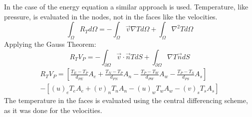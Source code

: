 In the case of the energy equation a similar approach is used. Temperature, like pressure, is evaluated in the nodes, not in the faces like the velocities.
\begin{equation}
\int_{\Omega}R_{T}d\Omega=-\int_{\Omega}\vec{v}\nabla Td\Omega+\int_{\Omega}\nabla^{2}Td\Omega
\end{equation}
Applying the Gauss Theorem:
\begin{equation}
R_{T}V_{P}=-\int_{\partial\Omega}\vec{v}\cdot\vec{n} TdS+\int_{\partial\Omega}\nabla T\vec{n}dS
\end{equation}
\begin{multline}
	R_{T}V_{P}=\left[\frac{T_{E}-T_{P}}{d_{PE}}A_{e}+\frac{T_{N}-T_{P}}{d_{PN}}A_{n}-\frac{T_{P}-T_{W}}{d_{PW}}A_{w}-\frac{T_{P}-T_{S}}{d_{PS}}A_{s}\right] \\
	-\left[\left(u\right)_{e}T_{e}A_{e}+\left(v\right)_{n}T_{n}A_{n}-\left(u\right)_{w}T_{w}A_{w}-\left(v\right)_{s}T_{s}A_{s}\right]
\end{multline}
The temperature in the faces is evaluated using the central differencing scheme, as it was done for the velocities.